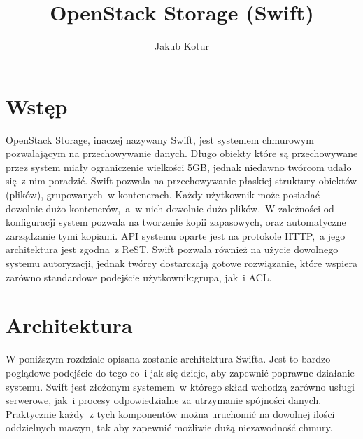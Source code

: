 


\title{OpenStack Storage (Swift)}
\author{Jakub Kotur}



\maketitle

\section{Wstęp}

\nocite{openstack}

OpenStack Storage, inaczej nazywany Swift, jest systemem chmurowym pozwalającym na przechowywanie danych. Długo obiekty które są przechowywane przez system miały ograniczenie wielkości 5GB, jednak niedawno twórcom udało się~z nim poradzić. Swift pozwala na przechowywanie płaskiej struktury obiektów (plików), grupowanych~w kontenerach. Każdy użytkownik może posiadać dowolnie dużo kontenerów,~a~w nich dowolnie dużo plików.~W zależności od konfiguracji system pozwala na tworzenie kopii zapasowych, oraz automatyczne zarządzanie tymi kopiami. API systemu oparte jest na protokole HTTP,~a jego architektura jest zgodna~z ReST. Swift pozwala również na użycie dowolnego systemu autoryzacji, jednak twórcy dostarczają gotowe rozwiązanie, które wspiera zarówno standardowe podejście użytkownik:grupa, jak~i ACL.



\section{Architektura}\label{sec:architektura}

W poniższym rozdziale opisana zostanie architektura Swifta. Jest to bardzo poglądowe podejście do tego co~i jak się dzieje, aby zapewnić poprawne działanie systemu. Swift jest złożonym systemem~w którego skład wchodzą zarówno usługi serwerowe, jak~i procesy odpowiedzialne za utrzymanie spójności danych. Praktycznie każdy~z tych komponentów można uruchomić na dowolnej ilości oddzielnych maszyn, tak aby zapewnić możliwie dużą niezawodność chmury.

